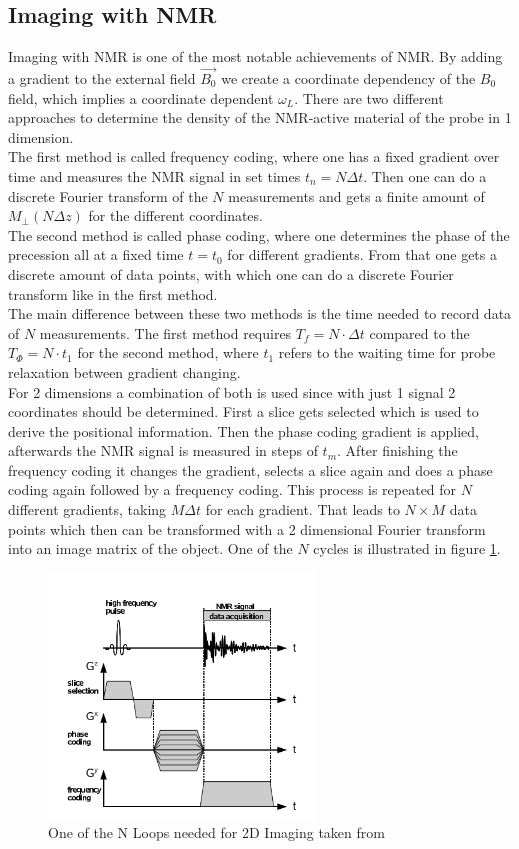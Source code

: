 \subsection{Imaging with NMR}\label{imagening}
Imaging with NMR is one of the most notable achievements of NMR. By adding a gradient to the external field $\vec{B_0}$ we create a coordinate dependency of the $B_0$ field, which implies a coordinate dependent $\omega_L$. There are two different approaches to determine the density of the NMR-active material of the probe in 1 dimension.
\vspace{2mm}\\
The first method is called frequency coding, where one has a fixed gradient over time and measures the NMR signal in set times $t_n = N \Delta t$. Then one can do a discrete Fourier transform of the $N$ measurements and gets a finite amount of $M_{\perp}(N \Delta z)$ for the different coordinates. 
\vspace{2mm}\\
The second method is called phase coding, where one determines the phase of the precession all at a fixed time $t = t_0$ for different gradients. From that one gets a discrete amount of data points, with which one can do a discrete Fourier transform like in the first method. 
\vspace{2mm}\\
The main difference between these two methods is the time needed to record data of $N$ measurements. The first method requires $T_f = N \cdot \Delta t$ compared to the $T_{\Phi} = N\cdot t_1$ for the second method, where $t_1$ refers to the waiting time for probe relaxation between gradient changing.
\vspace{3mm}\\
For 2 dimensions a combination of both is used since with just 1 signal 2 coordinates should be determined. First a slice gets selected which is used to derive the positional information.  Then the phase coding gradient is applied, afterwards the NMR signal is measured in steps of $t_m$. After finishing the frequency coding it changes the gradient, selects a slice again and does a phase coding again followed by a frequency coding. This process is repeated for $N$ different gradients, taking $M \Delta t$ for each gradient. That leads to $N \times M$ data points which then can be transformed with a 2 dimensional Fourier transform into an image matrix of the object. One of the $N$ cycles is illustrated in figure \ref{2dfourier}.\\
\begin{figure}[h]
	\centering
	\includegraphics[width=0.59\linewidth ,height=6.5cm]{images/2d_fourier.png}
	\caption{One of the N Loops needed for 2D Imaging taken from \cite{manual}}
	\label{2dfourier}
\end{figure}